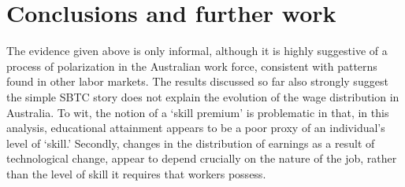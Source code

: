 \section{Conclusions and further work}

The evidence given above is only informal, although it is highly suggestive of a process of polarization in the Australian work force, consistent with patterns found in other labor markets. The results discussed so far also strongly suggest the simple SBTC story does not explain the evolution of the wage distribution in Australia. To wit, the notion of a `skill premium' is problematic in that, in this analysis, educational attainment appears to be a poor proxy of an individual's level of `skill.' Secondly, changes in the distribution of earnings as a result of technological change, appear to depend crucially on the nature of the job, rather than the level of skill it requires that workers possess.


